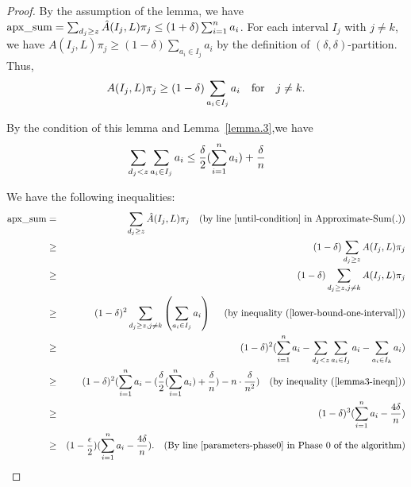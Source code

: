 \documentclass[runningheads]{llncs}
\newcommand{\appsum}{{\rm apx\_sum}}
\begin{document}
\begin{proof} By the assumption of the lemma, we have $\appsum=\sum_{d_j\ge z}\hat{A}(I_j,L)\pi_j\le
(1+\delta)\sum_{i=1}^n a_i$. For each interval $I_j$ with $j\not=k$,
we have $A(I_j,L)\pi_j\ge (1-\delta)\sum_{a_i\in I_j}a_i$ by the
definition of $(\delta,\delta)$-partition.  Thus,
\begin{eqnarray}
A(I_j,L)\pi_j\ge (1-\delta)\sum_{a_i\in I_j}a_i\ \ \ \mbox{for \ \
$j\not=k$.}\label{lower-bound-one-interval}
\end{eqnarray}

By the condition of this lemma and Lemma~\ref{lemma.3},we have
\begin{eqnarray}
\sum_{d_j<z}\sum_{a_i\in I_j} a_i\le { \delta\over 2}(\sum_{i=1}^n
a_i)+{\delta\over n}\ \ \ \ \ \label{lemma3-ineqn}
\end{eqnarray}


 We have the following inequalities:
\begin{eqnarray*}
\appsum&=&\sum_{d_j\ge z}\hat{A}(I_j,L)\pi_j\ \ \ \mbox{(by\ line~\ref{until-condition}\ in\ Approximate-Sum(.))}\\
&\ge&(1-\delta)\sum_{d_j\ge z}A(I_j,L)\pi_j\\
&\ge&(1-\delta)\sum_{d_j\ge z, j\not=k}A(I_j,L)\pi_j\\
&\ge&(1-\delta)^2\sum_{d_j\ge z,j\not=k}\left(\sum_{a_i\in I_j}a_i\right)\ \ \ \ \mbox{(by\ inequality~(\ref{lower-bound-one-interval}))}\\
&\ge&(1-\delta)^2(\sum_{i=1}^na_i-\sum_{d_j<z}\sum_{a_i\in I_j} a_i-\sum_{a_i\in I_k}a_i)\\
&\ge&(1-\delta)^2(\sum_{i=1}^na_i-({ \delta\over 2}(\sum_{i=1}^n a_i)+{\delta\over n})-n\cdot {\delta\over n^2})\ \ \ \mbox{(by\ inequality\ (\ref{lemma3-ineqn}))}\\
&\ge&(1-\delta)^3(\sum_{i=1}^na_i-{4\delta\over
n})\\
&\ge&(1-{\epsilon\over 2})(\sum_{i=1}^na_i-{4\delta\over n}). \ \ \
\mbox{(By\ line~\ref{parameters-phase0}\ in\ Phase\ 0\ of\ the\
algorithm)}
\end{eqnarray*}
\end{proof}
\end{document}

